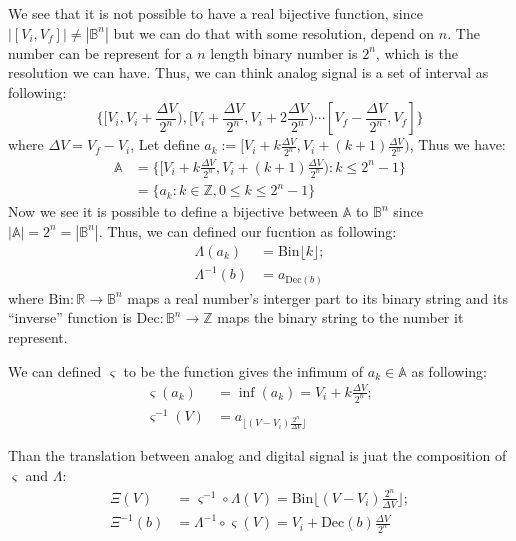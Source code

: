 \documentclass[aps,prl,reprint]{revtex4-1}
\begin{document}
    We see that it is not possible to have a real bijective function, since $|[V_i, V_f]| \neq |\mathbb{B}^n|$ but we can do that with some resolution, depend on $n$. The number can be represent for a $n$ length binary number is $2^n$, which is the resolution we can have. Thus, we can think analog signal is a set of interval as following:
    \[
    \{[V_i, V_i + \frac{\Delta V}{2^n}),[V_i + \frac{\Delta V}{2^n}, V_i + 2\frac{\Delta V}{2^n})\cdots [V_f - \frac{\Delta V}{2^n},V_f]\}
    \]
    where $\Delta V = V_f - V_i$, Let define $a_k:=[V_i + k \frac{\Delta V}{2^n}, V_i + (k+1)\frac{\Delta V}{2^n})$, Thus we have:
    \begin{align*}
        \mathbb{A} &= \{[V_i + k \frac{\Delta V}{2^n}, V_i + (k+1)\frac{\Delta V}{2^n}): k \le 2^n - 1\}\\
                   &= \{a_k:k\in \mathbb{Z},0 \le k \le 2^n - 1\}
    \end{align*}
    Now we see it is possible to define a bijective between $\mathbb{A}$ to $\mathbb{B}^n$ since $|\mathbb{A}| = 2^n = |\mathbb{B}^n|$. Thus, we can defined our fucntion as following:
    \begin{align*}
        \Lambda(a_k) &= \text{Bin}\lfloor k\rfloor ;\\
        \Lambda^{-1}(b) &= a_{\text{Dec}(b)}
    \end{align*}
    where $\text{Bin}: \mathbb{R} \rightarrow \mathbb{B}^n$ maps a real number's interger part to its binary string and its ``inverse'' function is $\text{Dec}: \mathbb{B}^n \rightarrow \mathbb{Z}$ maps the binary string to the number it represent.

    We can defined $\varsigma$ to be the function gives the infimum of $a_k\in\mathbb{A}$ as following:
    \begin{align*}
        \varsigma(a_k) &= \inf(a_k) = V_i + k \frac{\Delta V}{2^n};\\
        \varsigma^{-1}(V)&= a_{\lfloor(V-V_i)\frac{2^n}{\Delta V} \rfloor}
    \end{align*}

    Than the translation between analog and digital signal is juat the composition of $\varsigma$ and $\Lambda$:
    \begin{align}
        \Xi (V) &= \varsigma^{-1} \circ \Lambda (V) = \text{Bin}\lfloor (V-V_i)\frac{2^n}{\Delta V} \rfloor;\label{eq:anaToDig}\\
        \Xi^{-1} (b)&= \Lambda^{-1} \circ \varsigma(V) = V_i + \text{Dec}(b) \frac{\Delta V}{2^n} \label{eq:digToAna}
    \end{align}
\end{document}
